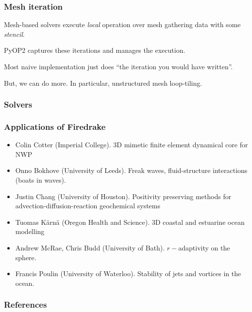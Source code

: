 \documentclass[presentation]{beamer}
\begin{document}
\begin{frame}
  \frametitle{Mesh iteration}
  Mesh-based solvers execute \emph{local} operation over mesh
  gathering data with some \emph{stencil}.

  PyOP2 captures these iterations and manages the execution.

  Most naive implementation just does ``the iteration you would have
  written''.

  But, we can do more.  In particular, unstructured mesh loop-tiling.
\end{frame}

\begin{frame}
  \frametitle{Solvers}
  
\end{frame}

\begin{frame}
  \frametitle{Applications of Firedrake}
  \begin{itemize}
  \item Colin Cotter (Imperial College).  3D mimetic finite element
    dynamical core for NWP
  \item Onno Bokhove (University of Leeds). Freak waves,
    fluid-structure interactions (boats in waves).
  \item Justin Chang (University of Houston).  Positivity preserving
    methods for advection-diffusion-reaction geochemical systems
  \item Tuomas K\"arn\"a (Oregon Health and Science). 3D coastal and
    estuarine ocean modelling
  \item Andrew McRae, Chris Budd (University of Bath).  $r-$adaptivity
    on the sphere.
  \item Francis Poulin (University of Waterloo).  Stability of jets
    and vortices in the ocean.
  \end{itemize}
\end{frame}
\appendix
\begin{frame}[allowframebreaks]
  \frametitle{References}
  \printbibliography[heading=none]
\end{frame}
\end{document}

